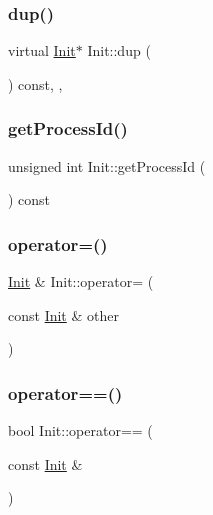 \subsubsection{\texorpdfstring{dup()}{dup()}}
{\footnotesize\ttfamily virtual \hyperlink{classInit}{Init}$\ast$ Init\+::dup (\begin{DoxyParamCaption}{ }\end{DoxyParamCaption}) const\hspace{0.3cm}{\ttfamily [inline]}, {\ttfamily [override]}, {\ttfamily [virtual]}}

\mbox{\label{classInit_a73d525231ae76ad98442d6f5b86bb994}} 
\subsubsection{\texorpdfstring{get\+Process\+Id()}{getProcessId()}}
{\footnotesize\ttfamily unsigned int Init\+::get\+Process\+Id (\begin{DoxyParamCaption}{ }\end{DoxyParamCaption}) const\hspace{0.3cm}{\ttfamily [virtual]}}

\mbox{\label{classInit_ab995dd231981ed97018c00b5fd8e9797}} 
\subsubsection{\texorpdfstring{operator=()}{operator=()}}
{\footnotesize\ttfamily \hyperlink{classInit}{Init} \& Init\+::operator= (\begin{DoxyParamCaption}\item[{const \hyperlink{classInit}{Init} \&}]{other }\end{DoxyParamCaption})}

\mbox{\label{classInit_a474b7c9ffdf72a6b2b58558ce68bb03e}} 
\subsubsection{\texorpdfstring{operator==()}{operator==()}}
{\footnotesize\ttfamily bool Init\+::operator== (\begin{DoxyParamCaption}\item[{const \hyperlink{classInit}{Init} \&}]{ }\end{DoxyParamCaption})\hspace{0.3cm}{\ttfamily [protected]}}

